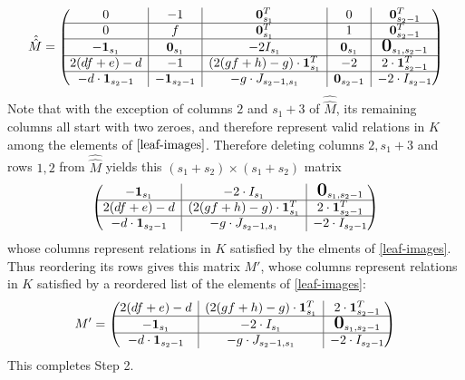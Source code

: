 \documentclass[10pt,reqno]{amsart}
\newcommand{\bigzero}{\mbox{\normalfont\Large\bfseries 0}}
\newcommand{\rvline}{\hspace*{-\arraycolsep}\vline\hspace*{-\arraycolsep}}
\def\onesvector{\mathbf{1}}
\def\zerovector{\mathbf{0}}
\begin{document}
\begin{equation*}    
\hat{\hat{M}}=
\begin{pmatrix}
0 & \rvline & -1 & \rvline & \zerovector^T_{s_1} & \rvline &0 &\rvline&\zerovector^T_{s_2-1}  \\
\hline

0 & \rvline & f & \rvline & \zerovector^T_{s_1} &\rvline & 
1& \rvline &\zerovector^T_{s_2-1} \\
\hline

-\onesvector_{s_1} & \rvline & \zerovector_{s_1} & \rvline & -2 I_{s_1}& \rvline & \zerovector_{s_1}&\rvline&\bigzero_{s_1,s_2-1} \\
\hline

2(df+e)-d  & \rvline & -1 & \rvline & (2(gf+h)-g) \cdot \onesvector^T_{s_1}& \rvline &-2&\rvline& 2\cdot \onesvector^T_{s_2-1} \\
\hline
-d\cdot \onesvector_{s_2-1} & \rvline & -\onesvector_{s_2-1} & \rvline & -g \cdot J_{s_2-1,s_1}& \rvline & \zerovector_{s_2-1} &\rvline& -2\cdot I_{s_2-1} 

\end{pmatrix}
\end{equation*}
Note that with the exception of columns $2$ and $s_1+3$ of $\hat{\hat{M}}$, its remaining columns all start with two zeroes, and therefore represent valid relations in $K$ among the elements of $\eqref{leaf-images}$.  Therefore deleting columns $2, s_1+3$ and rows $1,2$
from $\hat{\hat{M}}$ yields this 
 $(s_1 + s_2) \times (s_1 + s_2)$ matrix
$$
\begin{pmatrix*}
-\onesvector_{s_1} & \rvline & -2\cdot I_{s_1} & \rvline & \bigzero_{s_1,s_2-1} \\
\hline
2(df+e)-d  & \rvline & (2(gf+h)-g) \cdot \onesvector^T_{s_1} & \rvline & 2\cdot \onesvector^T_{s_2-1} \\
\hline
-d\cdot \onesvector_{s_2-1} & \rvline & -g\cdot J_{s_2-1,s_1} & \rvline & -2\cdot I_{s_2-1} 
\end{pmatrix*}
$$
whose columns represent relations in $K$ satisfied by
the elments of \eqref{leaf-images}.
Thus reordering its rows gives this matrix $M'$, whose columns represent relations in $K$ satisfied by a reordered list of
the elements of \eqref{leaf-images}:
\begin{equation}
\label{starting_matrix}
M'=
\begin{pmatrix*}
2(df+e)-d  & \rvline & (2(gf+h)-g) \cdot \onesvector^T_{s_1} & \rvline & 2\cdot \onesvector^T_{s_2-1} \\
\hline
-\onesvector_{s_1} & \rvline & -2\cdot I_{s_1} & \rvline & \bigzero_{s_1,s_2-1}  \\
\hline
-d\cdot \onesvector_{s_2-1} & \rvline & -g\cdot J_{s_2-1,s_1} & \rvline & -2\cdot I_{s_2-1}
\end{pmatrix*}
\end{equation}
This completes {\sf Step 2}.
\end{document}
